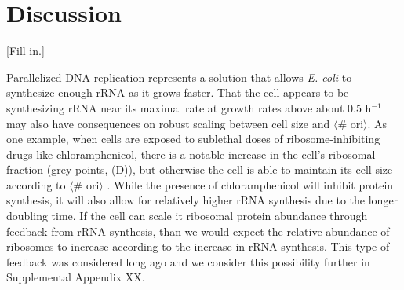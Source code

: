 \section{Discussion}

[Fill in.]

Parallelized DNA replication represents a solution that allows  \textit{E. coli}
to synthesize enough rRNA as it grows faster. That the cell appears to
be synthesizing rRNA near its maximal rate at growth rates above about 0.5 h$^{-1}$
may also have consequences on robust scaling  between
cell size and $\langle$\# ori$\rangle$. As one example, when cells are exposed
to sublethal doses of ribosome-inhibiting drugs like chloramphenicol, there is a
notable increase in the cell's ribosomal fraction (grey points,
(D)), but otherwise the cell is able to maintain
its cell size according to $\langle$\# ori$\rangle$ \citep{si2017}. While the
presence of chloramphenicol will inhibit protein synthesis, it will also allow
for relatively higher rRNA synthesis due to the longer doubling time. If the
cell can scale it ribosomal protein abundance through feedback from rRNA
synthesis, than we would expect the relative abundance of ribosomes to increase
according to the increase in rRNA synthesis. This type of feedback was
considered long ago \citep{nomura1984} and we consider this possibility further
in Supplemental Appendix XX.


%


